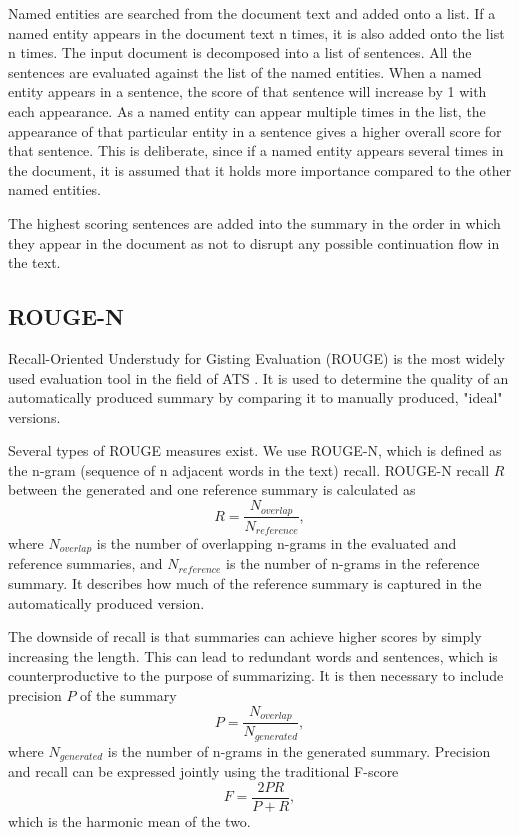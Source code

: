 \documentclass[conference]{IEEEtran}
\begin{document}
Named entities are searched from the document text and added onto a list. If a named entity appears in the document text n times, it is also added onto the list n times. 
The input document is decomposed into a list of sentences. 
All the sentences are evaluated against the list of the named entities. When a named entity appears in a sentence, the score of that sentence will increase by 1 with each appearance. 
As a named entity can appear multiple times in the list, the appearance of that particular entity in a sentence gives a higher overall score for that sentence. 
This is deliberate, since if a named entity appears several times in the document, it is assumed that it holds more importance compared to the other named entities. 

The highest scoring sentences are added into the summary in the order in which they appear in the document as not to disrupt any possible continuation flow in the text.


\subsection{ROUGE-N}
Recall-Oriented Understudy for Gisting Evaluation (ROUGE) \cite{lin2004} is the most widely used evaluation tool in the field of ATS \cite{el-kassas2020}. It is used to determine the quality of an automatically produced summary by comparing it to manually produced, "ideal" versions. 

Several types of ROUGE measures exist. We use ROUGE-N, which is defined as the n-gram (sequence of n adjacent words in the text) recall. ROUGE-N recall $R$ between the generated and one reference summary is calculated as
\begin{equation}
R = \frac{N_{overlap}}{N_{reference}},
\end{equation}
where $N_{overlap}$ is the number of overlapping n-grams in the evaluated and reference summaries, and $N_{reference}$ is the number of n-grams in the reference summary. It describes how much of the reference summary is captured in the automatically produced version.

The downside of recall is that summaries can achieve higher scores by simply increasing the length. This can lead to redundant words and sentences, which is counterproductive to the purpose of summarizing. It is then necessary to include precision $P$ of the summary
\begin{equation}
P = \frac{N_{overlap}}{N_{generated}},
\end{equation}
where $N_{generated}$ is the number of n-grams in the generated summary. Precision and recall can be expressed jointly using the traditional F-score
\begin{equation}
F = \frac{2PR}{P + R},
\end{equation}
which is the harmonic mean of the two.
\end{document}
